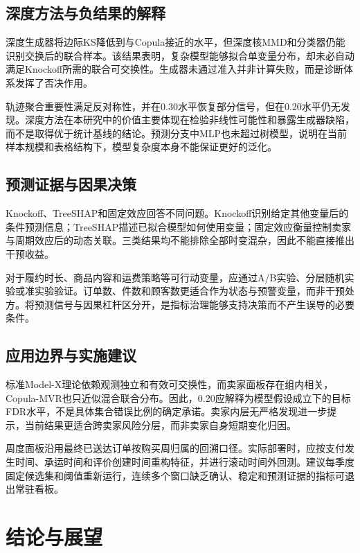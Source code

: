 \documentclass{sufethesismas}
\begin{document}
\section{深度方法与负结果的解释}

深度生成器将边际KS降低到与Copula接近的水平，但深度核MMD和分类器仍能识别交换后的联合样本。该结果表明，复杂模型能够拟合单变量分布，却未必自动满足Knockoff所需的联合可交换性。生成器未通过准入并非计算失败，而是诊断体系发挥了否决作用。

轨迹聚合重要性满足反对称性，并在0.30水平恢复部分信号，但在0.20水平仍无发现。深度方法在本研究中的价值主要体现在检验非线性可能性和暴露生成器缺陷，而不是取得优于统计基线的结论。预测分支中MLP也未超过树模型，说明在当前样本规模和表格结构下，模型复杂度本身不能保证更好的泛化。

\section{预测证据与因果决策}

Knockoff、TreeSHAP和固定效应回答不同问题。Knockoff识别给定其他变量后的条件预测信息；TreeSHAP描述已拟合模型如何使用变量；固定效应衡量控制卖家与周期效应后的动态关联。三类结果均不能排除全部时变混杂，因此不能直接推出干预收益。

对于履约时长、商品内容和运费策略等可行动变量，应通过A/B实验、分层随机实验或准实验验证。订单数、件数和顾客数更适合作为状态与预警变量，而非干预处方。将预测信号与因果杠杆区分开，是指标治理能够支持决策而不产生误导的必要条件。

\section{应用边界与实施建议}

标准Model-X理论依赖观测独立和有效可交换性，而卖家面板存在组内相关，Copula-MVR也只近似混合联合分布。因此，0.20应解释为模型假设成立下的目标FDR水平，不是具体集合错误比例的确定承诺。卖家内层无严格发现进一步提示，当前结果更适合跨卖家风险分层，而非卖家自身短期变化归因。

周度面板沿用最终已送达订单按购买周归属的回溯口径。实际部署时，应按支付发生时间、承运时间和评价创建时间重构特征，并进行滚动时间外回测。建议每季度固定候选集和阈值重新运行，连续多个窗口缺乏确认、稳定和预测证据的指标可退出常驻看板。

\chapter{结论与展望}
\end{document}
